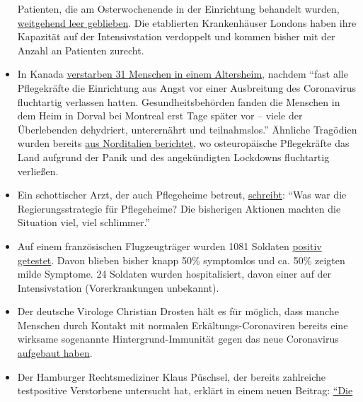 \begin{itemize}
  Patienten, die am Osterwochenende in der Einrichtung behandelt wurden,
  \href{https://www.hsj.co.uk/service-design/exclusive-nightingale-largely-empty-as-icus-handle-surge/7027398.article}{weitgehend
  leer geblieben}. Die etablierten Krankenhäuser Londons haben ihre
  Kapazität auf der Intensivstation verdoppelt und kommen bisher mit der
  Anzahl an Patienten zurecht.
\item
  In Kanada \href{https://orf.at/stories/3162365/}{verstarben 31
  Menschen in einem Altersheim}, nachdem ``fast alle Pflegekräfte die
  Einrichtung aus Angst vor einer Ausbreitung des Coronavirus
  fluchtartig verlassen hatten. Gesundheitsbehörden fanden die Menschen
  in dem Heim in Dorval bei Montreal erst Tage später vor -- viele der
  Überlebenden dehydriert, unterernährt und teilnahmslos.'' Ähnliche
  Tragödien wurden bereits
  \href{https://swprs.org/covid19-bericht-aus-italien/}{aus Norditalien
  berichtet}, wo osteuropäische Pflegekräfte das Land aufgrund der Panik
  und des angekündigten Lockdowns fluchtartig verließen.
\item
  Ein schottischer Arzt, der auch Pflegeheime betreut,
  \href{https://drmalcolmkendrick.org/2020/04/17/care-homes-and-covid19/}{schreibt}:
  ``Was war die Regierungs­strategie für Pflegeheime? Die bisherigen
  Aktionen machten die Situation viel, viel schlimmer.''
\item
  Auf einem französischen Flugzeugträger wurden 1081 Soldaten
  \href{https://www.ouest-france.fr/sante/virus/coronavirus/coronavirus-au-moins-940-marins-positifs-sur-le-charles-de-gaulle-et-son-escorte-6810816}{positiv
  getestet}. Davon blieben bisher knapp 50\% symptomlos und ca. 50\%
  zeigten milde Symptome. 24 Soldaten wurden hospitalisiert, davon einer
  auf der Intensivstation (Vorerkrankungen unbekannt).
\item
  Der deutsche Virologe Christian Drosten hält es für möglich, dass
  manche Menschen durch Kontakt mit normalen Erkältungs-Coronaviren
  bereits eine wirksame sogenannte Hintergrund-Immunität gegen das neue
  Coronavirus \href{https://www.watson.de/!324026684}{aufgebaut haben}.
\item
  Der Hamburger Rechtsmediziner Klaus Püschsel, der bereits zahlreiche
  testpositive Verstorbene untersucht hat, erklärt in einem neuen
  Beitrag:
  \href{https://www.abendblatt.de/hamburg/article228908865/hamburg-corona-virus-uke-infektion-covid-19-pueschel-coronavirus-krise-patienten-impfstoff-immunitaet-krankenhaeuser-kontaktverbot-kliniken-infektionsrate-krankheit-pandemie-test-lungenkrankheit-sars-cov-epidemie-sars-cov-2.html}{``Die
}
\end{itemize}
